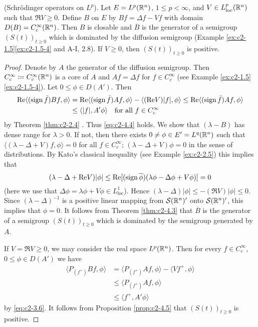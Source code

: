 \begin{example}\label{ex:c2-4.7}
(Schrödinger operators on $L^{p}$).
Let $E = L^{p}(\mathbb{R}^{n})$, $1 \leq p < \infty$, and $V \in L^{p}_{\text{loc}}(\mathbb{R}^{n})$ such that $\Re V \geq 0$.
Define $B$ on $E$ by $Bf = \Delta f - Vf$ with domain $D(B) = C^{\infty}_{c}(\mathbb{R}^{n})$. 
Then $B$ is closable and $\overline{B}$ is the generator of a semigroup $(S(t))_{t \geq 0}$ which is dominated by the diffusion semigroup (Example \ref{ex:c2-1.5}\ref{ex:c2-1.5-4} and A-I, 2.8). 
If $V \geq 0$, then $(S(t))_{t \geq 0}$ is positive.
\end{example}

\begin{proof}
Denote by $A$ the generator of the diffusion semigroup. 
Then $C^{\infty}_{c} \coloneq C^{\infty}_{c}(\mathbb{R}^{n})$ is a core of $A$ and $Af = \Delta f$ for $f \in C^{\infty}_{c}$ (see Example \ref{ex:c2-1.5}\ref{ex:c2-1.5-4}). 
Let $0 \leq \phi \in D(A')$. Then
\begin{align*}
\mathop{}\!\mathrm{Re}\langle(\operatorname{sign} \bar{f})Bf,\phi\rangle &= \mathop{}\!\mathrm{Re}\langle(\operatorname{sign} \bar{f})Af,\phi\rangle - \langle(\mathop{}\!\mathrm{Re} V)|f|,\phi\rangle \leq \mathop{}\!\mathrm{Re}\langle(\operatorname{sign} \bar{f})Af,\phi\rangle\\
&\leq \langle|f|,A'\phi\rangle \quad \text{for all } f \in C^{\infty}_{c} 
\end{align*}
by Theorem \ref{thm:c2-2.4}  .
Thus \eqref{eq:c2-4.4} holds.
We show that $(\lambda - B)$ has dense range for $\lambda > 0$. 
If not, then there exists $0 \neq \phi \in E' = L^{q}(\mathbb{R}^{n})$ such that $\langle(\lambda - \Delta + V)f,\phi\rangle = 0$ for all $f \in C^{\infty}_{c}$; \ie $(\lambda - \Delta + V)\phi = 0$ in the sense of distributions. 
By Kato's classical inequality (see Example \ref{ex:c2-2.5}) this implies that
\[
(\lambda - \Delta + \mathop{}\!\mathrm{Re} V)|\phi| \leq \mathop{}\!\mathrm{Re}[(\operatorname{sign} \overline{\phi})(\lambda\phi - \Delta\phi + V\phi)] = 0
\] 
(here we use that $\Delta\phi = \lambda\phi + V\phi \in L^{1}_{\text{loc}}$). 
Hence $(\lambda - \Delta)|\phi| \leq -(\Re V)|\phi| \leq 0$. 
Since $(\lambda - \Delta)^{-1}$ is a positive linear mapping from $\mathcal{S}(\mathbb{R}^{n})'$ onto $\mathcal{S}(\mathbb{R}^{n})'$, this implies that $\phi = 0$. 
It follows from Theorem \ref{thm:c2-4.3}   that $\overline{B}$ is the
generator of a semigroup $(S(t))_{t \geq 0}$ which is dominated by the semigroup generated by $A$.

If $V = \Re V \geq 0$, we may consider the real space $L^{p}(\mathbb{R}^{n})$. 
Then for every $f \in C^{\infty}_{c}$, $0 \leq \phi \in D(A')$ we have
\begin{align*}
\langle P_{(f^{+})}Bf,\phi\rangle &= \langle P_{(f^{+})}Af,\phi\rangle - \langle Vf^{+},\phi\rangle\\
&\leq \langle P_{(f^{+})}Af,\phi\rangle\\
&\leq \langle f^{+},A'\phi\rangle
\end{align*}
by \eqref{eq:c2-3.6}. 
It follows from  Proposition \ref{prop:c2-4.5} that $(S(t))_{t \geq 0}$ is positive.
\end{proof}

